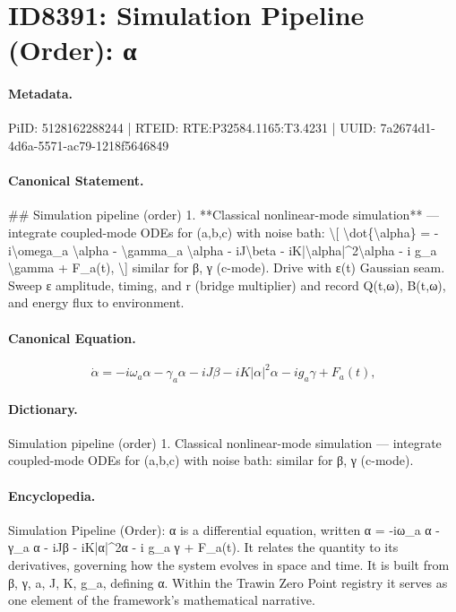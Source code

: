 \section*{ID8391: Simulation Pipeline (Order): α}
\paragraph{Metadata.}
PiID: 5128162288244 | RTEID: RTE:P32584.1165:T3.4231 | UUID: 7a2674d1-4d6a-5571-ac79-1218f5646849

\paragraph{Canonical Statement.}
\#\# Simulation pipeline (order) 1. **Classical nonlinear-mode simulation** — integrate coupled-mode ODEs for (a,b,c) with noise bath: \textbackslash{}[ \textbackslash{}dot\{\textbackslash{}alpha\} = -i\textbackslash{}omega\_a \textbackslash{}alpha - \textbackslash{}gamma\_a \textbackslash{}alpha - iJ\textbackslash{}beta - iK|\textbackslash{}alpha|\textasciicircum{}2\textbackslash{}alpha - i g\_a \textbackslash{}gamma + F\_a(t), \textbackslash{}] similar for β, γ (c-mode). Drive with ε(t) Gaussian seam. Sweep ε amplitude, timing, and r (bridge multiplier) and record Q(t,ω), B(t,ω), and energy flux to environment.

\paragraph{Canonical Equation.}
\[
\dot{\alpha} = -i\omega_a \alpha - \gamma_a \alpha - iJ\beta - iK|\alpha|^2\alpha - i g_a \gamma + F_a(t),
\]

\paragraph{Dictionary.}
Simulation pipeline (order) 1. Classical nonlinear-mode simulation — integrate coupled-mode ODEs for (a,b,c) with noise bath: similar for β, γ (c-mode).

\paragraph{Encyclopedia.}
Simulation Pipeline (Order): α is a differential equation, written α = -iω\_a α - γ\_a α - iJβ - iK|α|\textasciicircum{}2α - i g\_a γ + F\_a(t). It relates the quantity to its derivatives, governing how the system evolves in space and time. It is built from β, γ, a, J, K, g\_a, defining α. Within the Trawin Zero Point registry it serves as one element of the framework's mathematical narrative.

